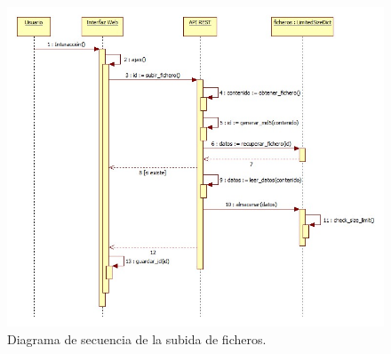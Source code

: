 \begin{enumerate}

\begin{figure}[H]
\centering
\includegraphics[scale=0.5]{figuras/sec_subir_fichero.jpg}
\caption{Diagrama de secuencia de la subida de ficheros.}
\label{fig:sec_subir_fichero}
\end{figure}


\end{enumerate}
